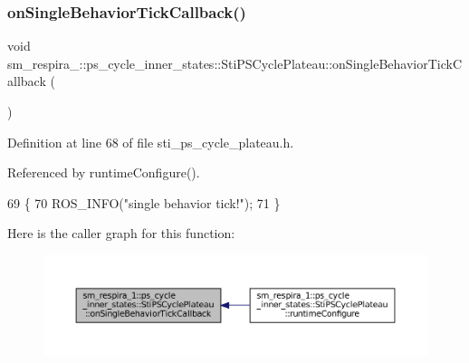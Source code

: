 \subsubsection{\texorpdfstring{on\+Single\+Behavior\+Tick\+Callback()}{onSingleBehaviorTickCallback()}}
{\footnotesize\ttfamily void sm\+\_\+respira\+\_\+::ps\+\_\+cycle\+\_\+inner\+\_\+states\+::\+Sti\+P\+S\+Cycle\+Plateau\+::on\+Single\+Behavior\+Tick\+Callback (\begin{DoxyParamCaption}{ }\end{DoxyParamCaption})\hspace{0.3cm}{\ttfamily [inline]}}



Definition at line 68 of file sti\+\_\+ps\+\_\+cycle\+\_\+plateau.\+h.



Referenced by runtime\+Configure().


\begin{DoxyCode}
69   \{
70     ROS\_INFO(\textcolor{stringliteral}{"single behavior tick!"});
71   \}
\end{DoxyCode}
Here is the caller graph for this function\+:
\nopagebreak
\begin{figure}[H]
\begin{center}
\leavevmode
\includegraphics[width=350pt]{structsm__respira__1_1_1ps__cycle__inner__states_1_1StiPSCyclePlateau_aa5baa83b5b2a295e6a8b8dbac7fe5b01_icgraph}
\end{center}
\end{figure}
\mbox{\label{structsm__respira__1_1_1ps__cycle__inner__states_1_1StiPSCyclePlateau_a474f210a65f1b5769b4debd1e2d555f8}} 
